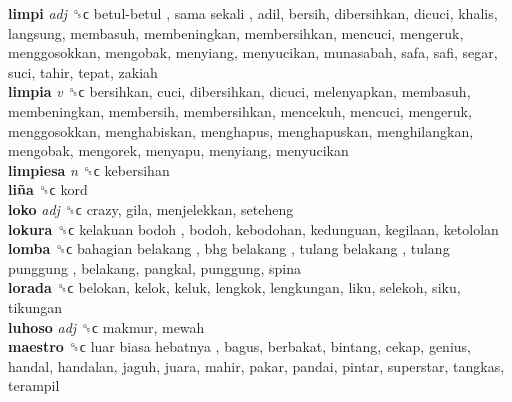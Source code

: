 \textbf{limpi} \emph{adj}  ␝ϲ   betul-betul ,  sama sekali , adil, bersih, dibersihkan, dicuci, khalis, langsung, membasuh, membeningkan, membersihkan, mencuci, mengeruk, menggosokkan, mengobak, menyiang, menyucikan, munasabah, safa, safi, segar, suci, tahir, tepat, zakiah  \\
\textbf{limpia} \emph{v}  ␝ϲ  bersihkan, cuci, dibersihkan, dicuci, melenyapkan, membasuh, membeningkan, membersih, membersihkan, mencekuh, mencuci, mengeruk, menggosokkan, menghabiskan, menghapus, menghapuskan, menghilangkan, mengobak, mengorek, menyapu, menyiang, menyucikan  \\
\textbf{limpiesa} \emph{n}  ␝ϲ  kebersihan  \\
\textbf{liña} ␝ϲ  kord  \\
\textbf{loko} \emph{adj}  ␝ϲ  crazy, gila, menjelekkan, seteheng  \\
\textbf{lokura} ␝ϲ   kelakuan bodoh , bodoh, kebodohan, kedunguan, kegilaan, ketololan  \\
\textbf{lomba} ␝ϲ   bahagian belakang ,  bhg belakang ,  tulang belakang ,  tulang punggung , belakang, pangkal, punggung, spina  \\
\textbf{lorada} ␝ϲ  belokan, kelok, keluk, lengkok, lengkungan, liku, selekoh, siku, tikungan  \\
\textbf{luhoso} \emph{adj}  ␝ϲ  makmur, mewah  \\
\textbf{maestro} ␝ϲ   luar biasa hebatnya , bagus, berbakat, bintang, cekap, genius, handal, handalan, jaguh, juara, mahir, pakar, pandai, pintar, superstar, tangkas, terampil  \\

